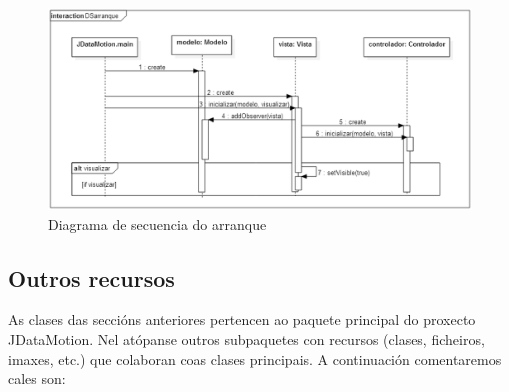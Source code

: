 \begin{figure}
\centering
\includegraphics[width=\textwidth,height=\textheight,keepaspectratio]{figuras/DSarranque}
\caption{Diagrama de secuencia do arranque}
\label{DSarranque}
\end{figure}

\subsection{Outros recursos}

As clases das seccións anteriores pertencen ao paquete principal do proxecto JDataMotion. Nel atópanse outros subpaquetes con recursos (clases, ficheiros, imaxes, etc.) que colaboran coas clases principais. A continuación comentaremos cales son:

